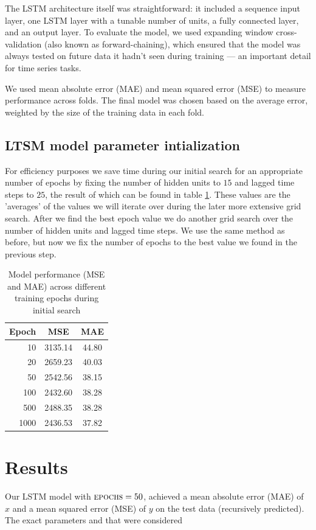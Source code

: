 \documentclass[conference]{IEEEtran}
\begin{document}
The LSTM architecture itself was straightforward: it included a sequence input layer, one LSTM layer with 
a tunable number of units, a fully connected layer, and an output layer. To evaluate the model, we used 
expanding window cross-validation (also known as forward-chaining), which ensured that the model was 
always tested on future data it hadn’t seen during training — an important detail for time series tasks.

We used mean absolute error (MAE) and mean squared error (MSE) to measure performance across folds. The 
final model was chosen based on the average error, weighted by the size of the training data in each fold.

\subsection{LTSM model parameter intialization}
For efficiency purposes we save time during our initial search for an appropriate number of epochs by 
fixing the number of hidden units to $15$ and lagged time steps to $25$, the result of which can be found in table \ref{tab:epoch_performance}. 
These values are the 'averages'
of the values we will iterate over during the later more extensive grid search. 
After we find the best epoch value we do another grid search over the number of hidden units and lagged
time steps. We use the same method as before, but now we fix the number of epochs to the best value
we found in the previous step. 

\begin{table}[h!]
    \centering
    \begin{tabular}{rcc}
    \hline
    \textbf{Epoch} & \textbf{MSE} & \textbf{MAE} \\
    \hline
    10   & 3135.14 & 44.80 \\
    20   & 2659.23 & 40.03 \\
    50   & 2542.56 & 38.15 \\
    100  & 2432.60 & 38.28 \\
    500  & 2488.35 & 38.28 \\
    1000 & 2436.53 & 37.82 \\
    \hline
    \end{tabular}
    \caption{Model performance (MSE and MAE) across different training epochs during initial search}
    \label{tab:epoch_performance}
\end{table}  

\section{Results}
Our LSTM model with $\textsc{epochs} = 50$,  achieved a mean absolute error (MAE) of $x$ and a mean squared error (MSE) of $y$ on the
test data (recursively predicted). The exact parameters and that were considered  
\end{document}

